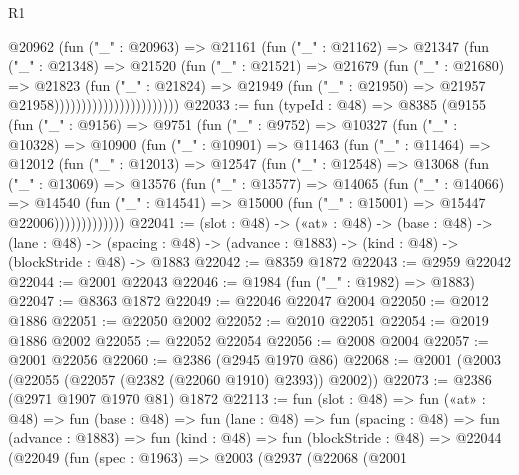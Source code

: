\begin{lexlean}{R1}
\begin{coremodule}
                                  @20962
                                    (fun ("_" : @20963) =>
                                    @21161
                                      (fun ("_" : @21162) =>
                                      @21347
                                        (fun ("_" : @21348) =>
                                        @21520
                                          (fun ("_" : @21521) =>
                                          @21679
                                            (fun ("_" : @21680) =>
                                            @21823
                                              (fun ("_" : @21824) =>
                                              @21949
                                                (fun ("_" : @21950) =>
                                                @21957 @21958)))))))))))))))))))))))
@22033 := fun (typeId : @48) =>
  @8385
    (@9155
      (fun ("_" : @9156) =>
      @9751
        (fun ("_" : @9752) =>
        @10327
          (fun ("_" : @10328) =>
          @10900
            (fun ("_" : @10901) =>
            @11463
              (fun ("_" : @11464) =>
              @12012
                (fun ("_" : @12013) =>
                @12547
                  (fun ("_" : @12548) =>
                  @13068
                    (fun ("_" : @13069) =>
                    @13576
                      (fun ("_" : @13577) =>
                      @14065
                        (fun ("_" : @14066) =>
                        @14540
                          (fun ("_" : @14541) =>
                          @15000 (fun ("_" : @15001) => @15447 @22006)))))))))))))
@22041 := (slot : @48) ->
  («at» : @48) ->
  (base : @48) ->
  (lane : @48) ->
  (spacing : @48) -> (advance : @1883) -> (kind : @48) -> (blockStride : @48) -> @1883
@22042 := @8359 @1872
@22043 := @2959 @22042
@22044 := @2001 @22043
@22046 := @1984 (fun ("_" : @1982) => @1883)
@22047 := @8363 @1872
@22049 := @22046 @22047 @2004
@22050 := @2012 @1886
@22051 := @22050 @2002
@22052 := @2010 @22051
@22054 := @2019 @1886 @2002
@22055 := @22052 @22054
@22056 := @2008 @2004
@22057 := @2001 @22056
@22060 := @2386 (@2945 @1970 @86)
@22068 := @2001 (@2003 (@22055 (@22057 (@2382 (@22060 @1910) @2393)) @2002))
@22073 := @2386 (@2971 @1907 @1970 @81) @1872
@22113 := fun (slot : @48) =>
  fun («at» : @48) =>
  fun (base : @48) =>
  fun (lane : @48) =>
  fun (spacing : @48) =>
  fun (advance : @1883) =>
  fun (kind : @48) =>
  fun (blockStride : @48) =>
  @22044
    (@22049
      (fun (spec : @1963) =>
      @2003
        (@2937
          (@22068
            (@2001

\end{coremodule}
\end{lexlean}
